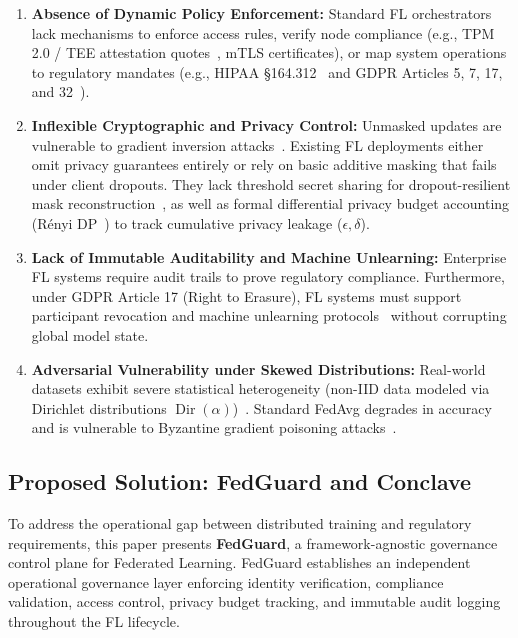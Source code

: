 \begin{enumerate}
    \item \textbf{Absence of Dynamic Policy Enforcement:} Standard FL orchestrators lack mechanisms to enforce access rules, verify node compliance (e.g., TPM 2.0 / TEE attestation quotes~\cite{mo2021ppfl}, mTLS certificates), or map system operations to regulatory mandates (e.g., HIPAA \S164.312~\cite{hipaa2003security} and GDPR Articles 5, 7, 17, and 32~\cite{gdpr2016regulation}).
    \item \textbf{Inflexible Cryptographic and Privacy Control:} Unmasked updates are vulnerable to gradient inversion attacks~\cite{zhu2019deep, geiping2020inverting}. Existing FL deployments either omit privacy guarantees entirely or rely on basic additive masking that fails under client dropouts. They lack threshold secret sharing for dropout-resilient mask reconstruction~\cite{bonawitz2017practical, bell2020secagg}, as well as formal differential privacy budget accounting (R\'enyi DP~\cite{mironov2017renyi, balle2020hypothesis}) to track cumulative privacy leakage ($\epsilon, \delta$).
    \item \textbf{Lack of Immutable Auditability and Machine Unlearning:} Enterprise FL systems require audit trails to prove regulatory compliance. Furthermore, under GDPR Article 17 (Right to Erasure), FL systems must support participant revocation and machine unlearning protocols~\cite{liu2021federaser, bourtoule2021machine, wang2023federated} without corrupting global model state.
    \item \textbf{Adversarial Vulnerability under Skewed Distributions:} Real-world datasets exhibit severe statistical heterogeneity (non-IID data modeled via Dirichlet distributions $\operatorname{Dir}(\alpha)$)~\cite{hsu2019measuring, li2020federated}. Standard FedAvg degrades in accuracy and is vulnerable to Byzantine gradient poisoning attacks~\cite{blanchard2017machine, fang2020local}.
\end{enumerate}

\subsection{Proposed Solution: FedGuard and Conclave}

To address the operational gap between distributed training and regulatory requirements, this paper presents \textbf{FedGuard}, a framework-agnostic governance control plane for Federated Learning. FedGuard establishes an independent operational governance layer enforcing identity verification, compliance validation, access control, privacy budget tracking, and immutable audit logging throughout the FL lifecycle.

